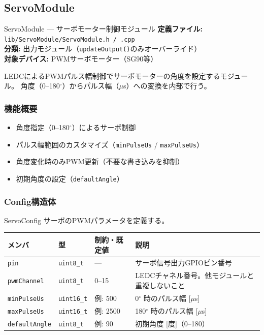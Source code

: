 \subsection{ServoModule}

\begin{apibox}{ServoModule --- サーボモーター制御モジュール}
\textbf{定義ファイル:} \texttt{lib/ServoModule/ServoModule.h / .cpp}\\
\textbf{分類:} 出力モジュール（\texttt{updateOutput()}のみオーバーライド）\\
\textbf{対象デバイス:} PWMサーボモーター（SG90等）

LEDCによるPWMパルス幅制御でサーボモーターの角度を設定するモジュール。
角度（0--180$^{\circ}$）からパルス幅（$\mu$s）への変換を内部で行う。
\end{apibox}

\subsubsection{機能概要}

\begin{itemize}
    \item 角度指定（0--180$^{\circ}$）によるサーボ制御
    \item パルス幅範囲のカスタマイズ（\texttt{minPulseUs} / \texttt{maxPulseUs}）
    \item 角度変化時のみPWM更新（不要な書き込みを抑制）
    \item 初期角度の設定（\texttt{defaultAngle}）
\end{itemize}

\subsubsection{Config構造体}

\begin{funcblock}{ServoConfig}
サーボのPWMパラメータを定義する。

\begin{longtable}{l l l p{4.5cm}}
\toprule
\textbf{メンバ} & \textbf{型} & \textbf{制約・既定値} & \textbf{説明} \\
\midrule
\endhead
\texttt{pin}          & \texttt{uint8\_t}  & ---       & サーボ信号出力GPIOピン番号 \\
\texttt{pwmChannel}   & \texttt{uint8\_t}  & 0--15     & LEDCチャネル番号。他モジュールと重複しないこと \\
\texttt{minPulseUs}   & \texttt{uint16\_t} & 例: 500   & 0$^{\circ}$ 時のパルス幅 [$\mu$s] \\
\texttt{maxPulseUs}   & \texttt{uint16\_t} & 例: 2500  & 180$^{\circ}$ 時のパルス幅 [$\mu$s] \\
\texttt{defaultAngle} & \texttt{uint8\_t}  & 例: 90    & 初期角度 [度]（0--180） \\
\bottomrule
\end{longtable}
\end{funcblock}

